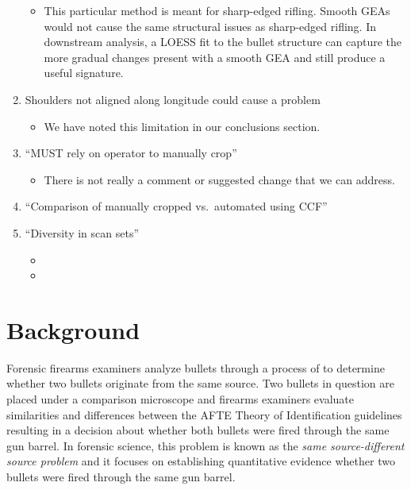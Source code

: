 \documentclass[12pt]{article}
\providecommand{\tightlist}{%
  \setlength{\itemsep}{0pt}\setlength{\parskip}{0pt}}
\begin{document}
\begin{enumerate}
  \begin{itemize}
  \tightlist
  \item
    This particular method is meant for sharp-edged rifling. Smooth GEAs
    would not cause the same structural issues as sharp-edged rifling.
    In downstream analysis, a LOESS fit to the bullet structure can
    capture the more gradual changes present with a smooth GEA and still
    produce a useful signature.
  \end{itemize}
\item
  Shoulders not aligned along longitude could cause a problem

  \begin{itemize}
  \tightlist
  \item
    We have noted this limitation in our conclusions section.
  \end{itemize}
\item
  ``MUST rely on operator to manually crop''

  \begin{itemize}
  \tightlist
  \item
    There is not really a comment or suggested change that we can
    address.
  \end{itemize}
\item
  ``Comparison of manually cropped vs.~automated using CCF''
\item
  ``Diversity in scan sets''

  \begin{itemize}
  \item
    {\color{teal}{We have added an additional test set, Houston-test, to our results section. This has also been detailed in the data source section.}}
  \item
    {\color{teal}{The figures have been updated to include the Houston-test set, but the table has not. Should the table for Hamby and Houston be kept separate?}}
  \end{itemize}
\end{enumerate}

\section{Background}

Forensic firearms examiners analyze bullets through a process of
{\color{teal}{visual comparison}} to determine whether two bullets
originate from the same source. Two bullets in question are placed under
a comparison microscope and firearms examiners evaluate similarities and
differences between
{\color{teal}{striated toolmarks produced on fired bullets from rifled barrels. The assessment of these patterns follows}}
the AFTE Theory of Identification \citep{AFTE} guidelines resulting in a
decision about whether both bullets were fired through the same gun
barrel. In forensic science, this problem is known as the \emph{same
source-different source problem} {\color{teal}{[see @Ommen1]}} and it
focuses on establishing quantitative evidence whether two bullets were
fired through the same gun barrel.
\end{document}
